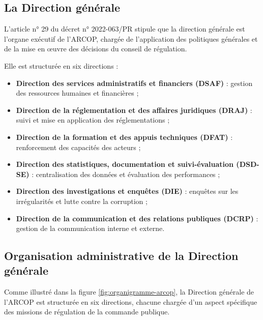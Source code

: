 \subsection{La Direction générale}
L’article n° 29 du décret n° 2022-063/PR stipule que la direction générale est l'organe exécutif de l’\ac{ARCOP}, chargée de l’application des politiques générales et de la mise en œuvre des décisions du conseil de régulation.

Elle est structurée en six directions :
\begin{itemize}
    \item \textbf{Direction des services administratifs et financiers (DSAF)} : gestion des ressources humaines et financières ;
    \item \textbf{Direction de la réglementation et des affaires juridiques (DRAJ)} : suivi et mise en application des réglementations ;
    \item \textbf{Direction de la formation et des appuis techniques (DFAT)} : renforcement des capacités des acteurs ;
    \item \textbf{Direction des statistiques, documentation et suivi-évaluation (DSD-SE)} : centralisation des données et évaluation des performances ;
    \item \textbf{Direction des investigations et enquêtes (DIE)} : enquêtes sur les irrégularités et lutte contre la corruption ;
    \item \textbf{Direction de la communication et des relations publiques (DCRP)} : gestion de la communication interne et externe.
\end{itemize}

\subsection{Organisation administrative de la Direction générale}

Comme illustré dans la figure \ref{fig:organigramme-arcop}, la Direction générale de l'\ac{ARCOP} est structurée en six directions, chacune chargée d'un aspect spécifique des missions de régulation de la commande publique.


